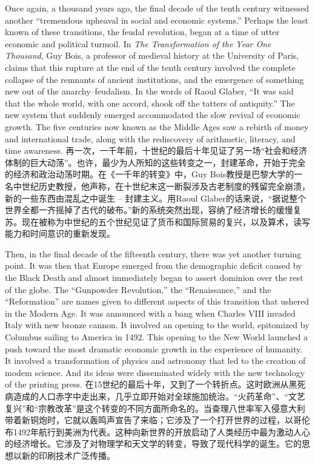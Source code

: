 \begin{Parallel}{97mm}{45mm}
  \ParallelLText
  {Once again, a thousand years ago, the final decade of the tenth century witnessed another “tremendous upheaval in social and economic systems.” Perhaps the least known of these transitions, the feudal revolution, began at a time of utter economic and political turmoil. In \emph{The Transformation of the Year One Thousand}, Guy Bois, a professor of medieval history at the University of Paris, claims that this rupture at the end of the tenth century involved the complete collapse of the remnants of ancient institutions, and the emergence of something new out of the anarchy--feudalism. In the words of Raoul Glaber, “It was said that the whole world, with one accord, shook off the tatters of antiquity.” The new system that suddenly emerged accommodated the slow revival of economic growth. The five centuries now known as the Middle Ages saw a rebirth of money and international trade, along with the rediscovery of arithmetic, literacy, and time awareness. }  
  \ParallelRText
  {\small 再一次，一千年前，十世纪的最后十年见证了另一场“社会和经济体制的巨大动荡”。也许，最少为人所知的这些转变之一，封建革命，开始于完全的经济和政治动荡时期。在《一千年的转变》中，Guy Bois教授是巴黎大学的一名中世纪历史教授，他声称，在十世纪末这一断裂涉及古老制度的残留完全崩溃，新的一些东西由混乱之中诞生 -- 封建主义。用Raoul Glaber的话来说，“据说整个世界全都一齐摇掉了古代的破布。”新的系统突然出现，容纳了经济增长的缓慢复苏。现在被称为中世纪的五个世纪见证了货币和国际贸易的复兴，以及算术，读写能力和时间意识的重新发现。}
  \ParallelPar


  \ParallelLText
  {Then, in the final decade of the fifteenth century, there was yet another turning point. It was then that Europe emerged from the demographic deficit caused by the Black Death and almost immediately began to assert dominion over the rest of the globe. The “Gunpowder Revolution,” the “Renaissance,” and the “Reformation” are names given to different aspects of this transition that ushered in the Modern Age. It was announced with a bang when Charles VIII invaded Italy with new bronze cannon. It involved an opening to the world, epitomized by Columbus sailing to America in 1492. This opening to the New World launched a push toward the most dramatic economic growth in the experience of humanity. It involved a transformation of physics and astronomy that led to the creation of modem science. And its ideas were disseminated widely with the new technology of the printing press. }  
  \ParallelRText
  {\small 在15世纪的最后十年，又到了一个转折点。这时欧洲从黑死病造成的人口赤字中走出来，几乎立即开始对全球施加统治。“火药革命”、“文艺复兴”和“宗教改革”是这个转变的不同方面所命名的。当查理八世率军入侵意大利带着新铜炮时，它就以轰鸣声宣告了来临；它涉及了一个打开世界的过程，以哥伦布1492年航行到美洲为代表。这种向新世界的开放启动了人类经历中最为激动人心的经济增长。它涉及了对物理学和天文学的转变，导致了现代科学的诞生。它的思想以新的印刷技术广泛传播。}
  \ParallelPar



\end{Parallel}

